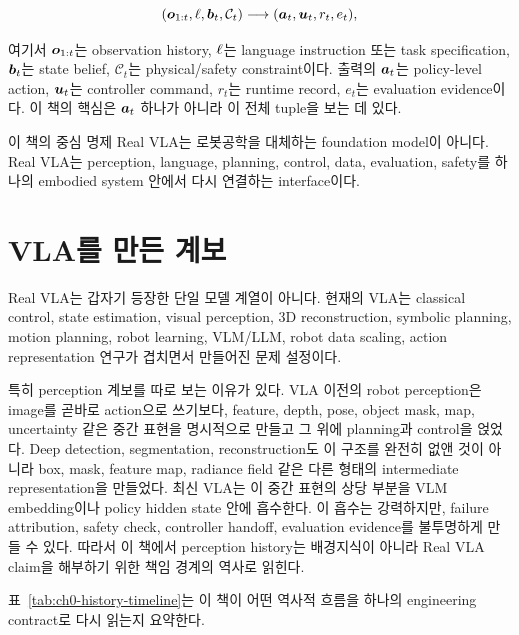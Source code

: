 \begin{equation}
  (\bm{o}_{1:t}, \ell, \bm{b}_t, \mathcal{C}_t)
  \longrightarrow
  (\bm{a}_t, \bm{u}_t, r_t, e_t),
  \label{eq:ch0-real-vla-map}
\end{equation}

여기서 $\bm{o}_{1:t}$는 observation history, $\ell$는 language instruction 또는 task specification, $\bm{b}_t$는 state belief, $\mathcal{C}_t$는 physical/safety constraint이다. 출력의 $\bm{a}_t$는 policy-level action, $\bm{u}_t$는 controller command, $r_t$는 runtime record, $e_t$는 evaluation evidence이다. 이 책의 핵심은 $\bm{a}_t$ 하나가 아니라 이 전체 tuple을 보는 데 있다.

\begin{definitionbox}{이 책의 중심 명제}
Real VLA는 로봇공학을 대체하는 foundation model이 아니다. Real VLA는 perception, language, planning, control, data, evaluation, safety를 하나의 embodied system 안에서 다시 연결하는 interface이다.
\end{definitionbox}

\section{VLA를 만든 계보}

Real VLA는 갑자기 등장한 단일 모델 계열이 아니다. 현재의 VLA는 classical control, state estimation, visual perception, 3D reconstruction, symbolic planning, motion planning, robot learning, VLM/LLM, robot data scaling, action representation 연구가 겹치면서 만들어진 문제 설정이다.

특히 perception 계보를 따로 보는 이유가 있다. VLA 이전의 robot perception은 image를 곧바로 action으로 쓰기보다, feature, depth, pose, object mask, map, uncertainty 같은 중간 표현을 명시적으로 만들고 그 위에 planning과 control을 얹었다. Deep detection, segmentation, reconstruction도 이 구조를 완전히 없앤 것이 아니라 box, mask, feature map, radiance field 같은 다른 형태의 intermediate representation을 만들었다. 최신 VLA는 이 중간 표현의 상당 부분을 VLM embedding이나 policy hidden state 안에 흡수한다. 이 흡수는 강력하지만, failure attribution, safety check, controller handoff, evaluation evidence를 불투명하게 만들 수 있다. 따라서 이 책에서 perception history는 배경지식이 아니라 Real VLA claim을 해부하기 위한 책임 경계의 역사로 읽힌다.

표~\ref{tab:ch0-history-timeline}는 이 책이 어떤 역사적 흐름을 하나의 engineering contract로 다시 읽는지 요약한다.

